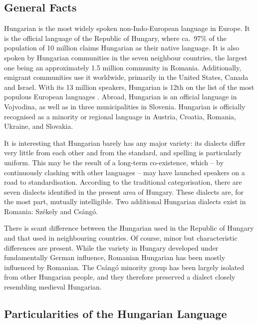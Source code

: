 \begin{multicols}{2}

\subsection{General Facts}

Hungarian is the most widely spoken non-Indo-European language in Europe. It is the official language of the Republic of Hungary, where ca.\ 97\% of the population of 10 million claims Hungarian as their native language. It is also spoken by Hungarian communities in the seven neighbour countries, the largest one being an approximately 1.5 million community in Romania. Additionally, emigrant communities use it worldwide, primarily in the United States, Canada and Israel. With its 13 million speakers, Hungarian is 12th on the list of the most populous European languages \cite{didyouknow1}. Abroad, Hungarian is an official language in Vojvodina, as well as in three municipalities in Slovenia. Hungarian is officially recognised as a minority or regional language in Austria, Croatia, Romania, Ukraine, and Slovakia.

It is interesting that Hungarian barely has any major variety: its dialects differ very little from each other and from the standard, and spelling is particularly uniform. This may be the result of a long-term co-existence, which -- by continuously clashing with other languages -- may have launched speakers on a road to standardisation. According to the traditional categorisation, there are seven dialects identified in the present area of Hungary. These dialects are, for the most part, mutually intelligible. Two additional Hungarian dialects exist in Romania: Székely and Csángó.

There is scant difference between the Hungarian used in the Republic of Hungary and that used in neighbouring countries. Of course, minor but characteristic differences are present. While the variety in Hungary developed under fundamentally German influence, Romanian Hungarian has been mostly influenced by Romanian. The Csángó minority group has been largely isolated from other Hungarian people, and they therefore preserved a dialect closely resembling medieval Hungarian.


\subsection{Particularities of the Hungarian Language}


\end{multicols}
